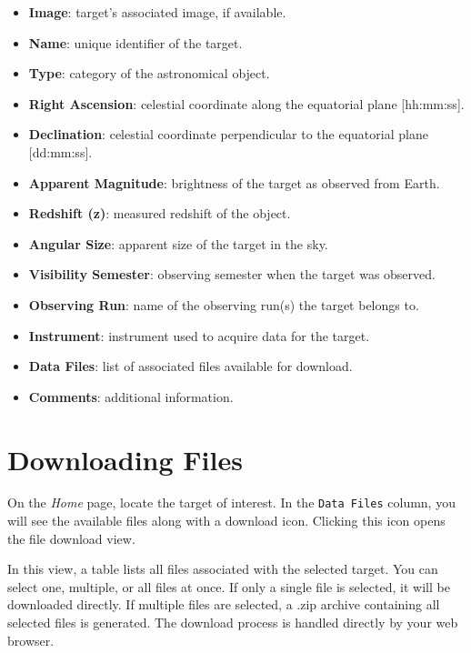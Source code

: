 \begin{itemize}
	\item \textbf{Image}: target's associated image, if available.
	\item \textbf{Name}: unique identifier of the target.
	\item \textbf{Type}: category of the astronomical object.
	\item \textbf{Right Ascension}: celestial coordinate along the equatorial plane [hh:mm:ss].
	\item \textbf{Declination}: celestial coordinate perpendicular to the equatorial plane [dd:mm:ss].
	\item \textbf{Apparent Magnitude}: brightness of the target as observed from Earth.
	\item \textbf{Redshift (z)}: measured redshift of the object.
	\item \textbf{Angular Size}: apparent size of the target in the sky.
	\item \textbf{Visibility Semester}: observing semester when the target was observed.
	\item \textbf{Observing Run}: name of the observing run(s) the target belongs to.
	\item \textbf{Instrument}: instrument used to acquire data for the target.
	\item \textbf{Data Files}: list of associated files available for download.
	\item \textbf{Comments}: additional information.
\end{itemize}



\chapter{Downloading Files} \label{chap:user-download-files}
   	
  	On the \textsl{Home} page, locate the target of interest. In the \texttt{Data Files} column, you will see the available files along with a download icon. Clicking this icon opens the file download view.

\addimage

In this view, a table lists all files associated with the selected target. You can select one, multiple, or all files at once. If only a single file is selected, it will be downloaded directly. If multiple files are selected, a .zip archive containing all selected files is generated. The download process is handled directly by your web browser.

